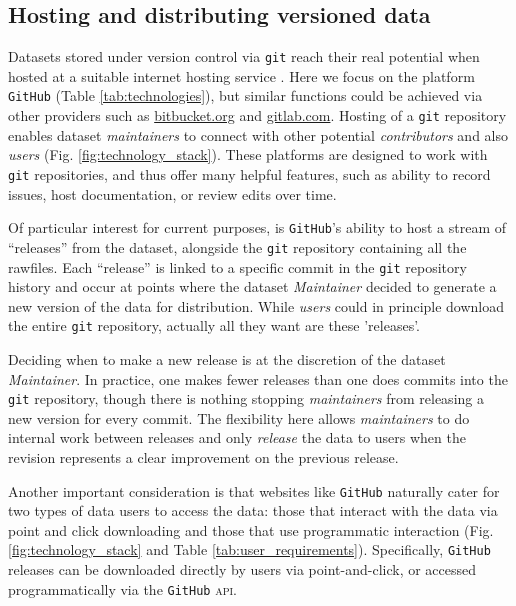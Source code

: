 \documentclass[a4paper,11pt]{article}
\begin{document}
\subsection{Hosting and distributing versioned data}

Datasets stored under version control via \texttt{git} reach their real potential when hosted at a suitable internet hosting service \citep{Ram-2013,Perkel-2016}. Here we focus on the platform \texttt{GitHub} (Table \ref{tab:technologies}), but similar functions could be achieved via other providers such as \href{http://bitbucket.org}{bitbucket.org} and \href{http://gitlab.com}{gitlab.com}. Hosting of a \texttt{git} repository enables dataset \emph{maintainers} to connect with other potential \emph{contributors} and also \emph{users} (Fig. \ref{fig:technology_stack}). These platforms are designed to work with \texttt{git} repositories, and thus offer many helpful features, such as ability to record issues, host documentation, or review edits over time.

Of particular interest for current purposes, is \texttt{GitHub}'s ability to host a stream of ``releases'' from the dataset, alongside the \texttt{git} repository containing all the rawfiles. Each ``release'' is linked to a specific commit in the \texttt{git} repository history and occur at points where the dataset \emph{Maintainer} decided to generate a new  version of the data for distribution. While \emph{users} could in principle download the entire \texttt{git} repository, actually all they want are these 'releases'.

Deciding when to make a new release is at the discretion of the dataset \emph{Maintainer}. In practice, one makes fewer releases than one does commits into the \texttt{git} repository, though there is nothing stopping \emph{maintainers} from releasing a new version for every commit. The flexibility here allows \emph{maintainers} to do internal work between releases and only \emph{release} the data to users when the revision represents a clear improvement on the previous release.

Another important consideration is that websites like \texttt{GitHub} naturally cater for two types of data users to access the data: those that interact with the data via point and click downloading and those that use programmatic interaction (Fig. \ref{fig:technology_stack} and Table \ref{tab:user_requirements}). Specifically, \texttt{GitHub} releases can be downloaded directly by users via point-and-click, or accessed programmatically via the \texttt{GitHub} \textsc{api}.
\end{document}
